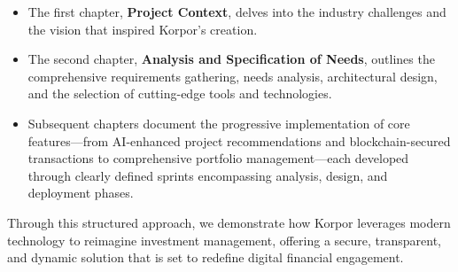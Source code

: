 \begin{itemize}[leftmargin=1.5em, itemsep=0pt, parsep=0pt, topsep=0.05cm]
\item The first chapter, \textbf{\textcolor{primary}{Project Context}}, delves into the industry challenges and the vision that inspired Korpor's creation.
\item The second chapter, \textbf{\textcolor{primary}{Analysis and Specification of Needs}}, outlines the comprehensive requirements gathering, needs analysis, architectural design, and the selection of cutting-edge tools and technologies.
\item Subsequent chapters document the progressive implementation of core features—from AI-enhanced project recommendations and blockchain-secured transactions to comprehensive portfolio management—each developed through clearly defined sprints encompassing analysis, design, and deployment phases.
\end{itemize}

\vspace{0.05cm}
\noindent Through this structured approach, we demonstrate how Korpor leverages modern technology to reimagine investment management, offering a secure, transparent, and dynamic solution that is set to redefine digital financial engagement.

\endgroup %
\enlargethispage{4cm} %
